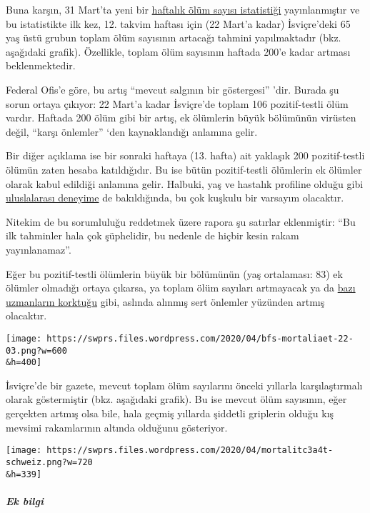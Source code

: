 Buna karşın, 31 Mart'ta yeni bir
\href{https://www.bfs.admin.ch/bfs/de/home/statistiken/gesundheit/gesundheitszustand/sterblichkeit-todesursachen.html}{haftalık
ölüm sayısı istatistiği} yayınlanmıştır ve bu istatistikte ilk kez, 12.
takvim haftası için (22 Mart'a kadar) İsviçre'deki 65 yaş üstü grubun
toplam ölüm sayısının artacağı tahmini yapılmaktadır (bkz. aşağıdaki
grafik). Özellikle, toplam ölüm sayısının haftada 200'e kadar artması
beklenmektedir.

Federal Ofis'e göre, bu artış ``mevcut salgının bir göstergesi'' 'dir.
Burada şu sorun ortaya çıkıyor: 22 Mart'a kadar İsviçre'de toplam 106
pozitif-testli ölüm vardır. Haftada 200 ölüm gibi bir artış, ek
ölümlerin büyük bölümünün virüsten değil, ``karşı önlemler'' `den
kaynaklandığı anlamına gelir.

Bir diğer açıklama ise bir sonraki haftaya (13. hafta) ait yaklaşık 200
pozitif-testli ölümün zaten hesaba katıldığıdır. Bu ise bütün
pozitif-testli ölümlerin ek ölümler olarak kabul edildiği anlamına
gelir. Halbuki, yaş ve hastalık profiline olduğu gibi
\href{https://swprs.org/rki-relativiert-corona-todesfaelle/}{uluslalarası
deneyime} de bakıldığında, bu çok kuşkulu bir varsayım olacaktır.

Nitekim de bu sorumluluğu reddetmek üzere rapora şu satırlar
eklenmiştir: ``Bu ilk tahminler hala çok şüphelidir, bu nedenle de
hiçbir kesin rakam yayınlanamaz''.

Eğer bu pozitif-testli ölümlerin büyük bir bölümünün (yaş ortalaması:
83) ek ölümler olmadığı ortaya çıkarsa, ya toplam ölüm sayıları
artmayacak ya da
\href{https://swprs.org/open-letter-from-professor-sucharit-bhakdi-to-german-chancellor-dr-angela-merkel/}{bazı
uzmanların korktuğu} gibi, aslında alınmış sert önlemler yüzünden artmış
olacaktır.

\texttt{[image: https://swprs.files.wordpress.com/2020/04/bfs-mortaliaet-22-03.png?w=600\\\&h=400]}

İsviçre'de bir gazete, mevcut toplam ölüm sayılarını önceki yıllarla
karşılaştırmalı olarak göstermiştir (bkz. aşağıdaki grafik). Bu ise
mevcut ölüm sayısının, eğer gerçekten artmış olsa bile, hala geçmiş
yıllarda şiddetli griplerin olduğu kış mevsimi rakamlarının altında
olduğunu gösteriyor.

\texttt{[image: https://swprs.files.wordpress.com/2020/04/mortalitc3a4t-schweiz.png?w=720\\\&h=339]}

\hypertarget{ek-bilgi}{%
\subparagraph{\texorpdfstring{\textbf{Ek
bilgi}}{Ek bilgi}}\label{ek-bilgi}}

